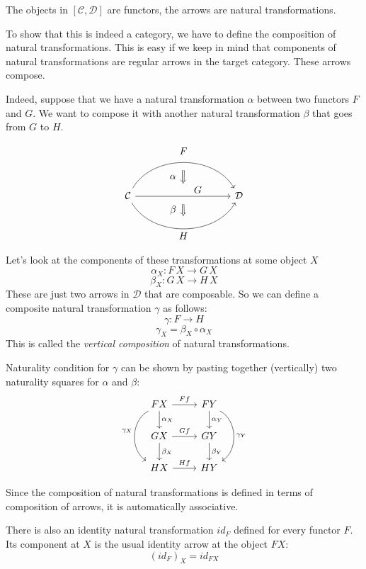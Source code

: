 \documentclass[DaoFP]{subfiles}
\begin{document}
The objects in $[\mathcal{C}, \mathcal{D}]$ are functors, the arrows are natural transformations. 

To show that this is indeed a category, we have to define the composition of natural transformations. This is easy if we keep in mind that components of natural transformations are regular arrows in the target category. These arrows compose.

Indeed, suppose that we have a natural transformation $\alpha$ between two functors $F$ and $G$. We want to compose it with another natural transformation $\beta$ that goes from $G$ to $H$. 

\[
\begin{tikzcd}[column sep=huge]
\mathcal{C}
  \arrow[bend left=60]{rr}[name=U, label=above:$F$]{}
  \arrow[]{rr}[name=M, label={[xshift=15pt, yshift=-5pt]:$G$}]{} 
  \arrow[bend right=60]{rr}[name=D, label=below:$H$]{} 
 &&
\mathcal{D}
  \arrow[shorten <=8pt, shorten >=8pt,Rightarrow, to path={(U) -- node[label=left:$\alpha$] {} (M)}]{}
  \arrow[shorten <=8pt, shorten >=8pt,Rightarrow, to path={(M) -- node[label=left:$\beta$] {} (D)}]{}
\end{tikzcd}
\]


Let's look at the components of these transformations at some object $X$
\[ \alpha_X \colon F \, X \to G \, X \]
\[ \beta_X \colon G \, X \to H \, X \]
These are just two arrows in $\mathcal{D}$ that are composable. So we can define a composite natural transformation $\gamma$ as follows:
\[ \gamma \colon F \to H\]
\[ \gamma_X = \beta_X \circ \alpha_X \]
 This is called the \emph{vertical composition} of natural transformations.

Naturality condition for $\gamma$ can be shown by pasting together (vertically) two naturality squares for $\alpha$ and $\beta$:
\[
 \begin{tikzcd}
 F X
 \arrow[d, "\alpha_X"]
 \arrow[r, "F f"]
 \arrow[dd, bend right = 60, "\gamma_X"']
 &
F Y
  \arrow[d, "\alpha_Y"]
 \arrow[dd, bend left = 60, "\gamma_Y"]
 \\
G X
 \arrow[r, "G f"]
 \arrow[d, "\beta_X"]
& G Y
\arrow[d, "\beta_Y"]
\\
H X
\arrow[r, "H f"]
& H Y
 \end{tikzcd}
\]

Since the composition of natural transformations is defined in terms of composition of arrows, it is automatically associative. 

There is also an identity natural transformation $id_F$ defined for every functor $F$. Its component at $X$ is the usual identity arrow at the object $F X$:
\[ (id_F)_X = id_{F X} \]
\end{document}
